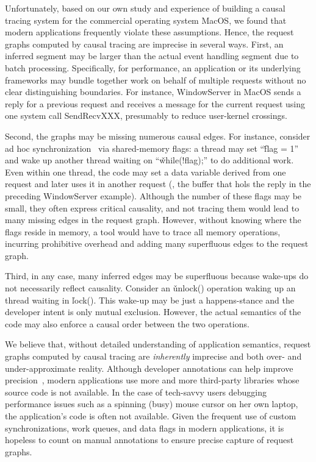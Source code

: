 Unfortunately, based on our own study and experience of building a causal
tracing system for the commercial operating system MacOS, we found that modern
applications frequently violate these assumptions. Hence, the request
graphs computed by causal tracing are imprecise in several ways.  First, an
inferred segment may be larger than the actual event handling segment due
to batch processing.  Specifically, for performance, an application or its
underlying frameworks may bundle together work on behalf of multiple requests
without no clear distinguishing boundaries.  For instance, WindowServer
in MacOS sends a reply for a previous request and receives a
message for the current request using one system call SendRecvXXX,
presumably to reduce user-kernel crossings.

Second, the graphs may be missing numerous causal edges.  For instance,
consider ad hoc synchronization~\cite{xxx} via shared-memory flags: a
thread may set ``\v{flag = 1}'' and wake up another thread waiting on
``\v{while(!flag);}'' to do additional work.  Even within one thread,
the code may set a data variable derived from one request and later uses
it in another request (\eg, the buffer that hols the reply in the
preceding WindowServer example). Although the number of these
flags may be small, they often express critical causality, and not tracing
them would lead to many missing edges in the request graph.  However,
without knowing where the flags reside in memory, a tool would have to
trace all memory operations, incurring prohibitive overhead and
adding many superfluous edges to the request graph.

Third, in any case, many inferred edges may be superfluous because wake-ups do not
necessarily reflect causality.  Consider an \v{unlock()} operation waking
up an thread waiting in \v{lock()}.  This wake-up may be just a
happens-stance and the developer intent is only mutual exclusion.
However, the actual semantics of the code may also enforce a causal order
between the two operations.

We believe that, without detailed understanding of application semantics,
request graphs computed by causal tracing are \emph{inherently} imprecise
and both over- and under-approximate reality.  Although developer
annotations can help improve precision~\cite{}, modern applications use
more and more third-party libraries whose source code is not available.
In the case of tech-savvy users debugging performance issues such as a spinning
(busy) mouse cursor on her own laptop, the application's code is often not
available.  Given the frequent use of custom synchronizations, work
queues, and data flags in modern applications, it is hopeless to
count on manual annotations to ensure precise capture of request graphs.

